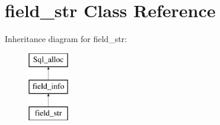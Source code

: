 \hypertarget{classfield__str}{}\section{field\+\_\+str Class Reference}
\label{classfield__str}
Inheritance diagram for field\+\_\+str\+:\begin{figure}[H]
\begin{center}
\leavevmode
\includegraphics[height=3.000000cm]{classfield__str}
\end{center}
\end{figure}
